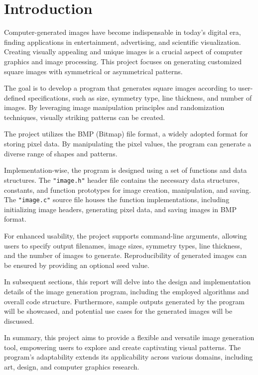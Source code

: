 \documentclass{report}
\begin{document}
\section {Introduction}
\begin{introduction}
    Computer-generated images have become indispensable in today's digital era, finding applications in entertainment, advertising, and scientific visualization. Creating visually appealing and unique images is a crucial aspect of computer graphics and image processing. This project focuses on generating customized square images with symmetrical or asymmetrical patterns.

The goal is to develop a program that generates square images according to user-defined specifications, such as size, symmetry type, line thickness, and number of images. By leveraging image manipulation principles and randomization techniques, visually striking patterns can be created.

The project utilizes the BMP (Bitmap) file format, a widely adopted format for storing pixel data. By manipulating the pixel values, the program can generate a diverse range of shapes and patterns.

Implementation-wise, the program is designed using a set of functions and data structures. The \texttt{"image.h"} header file contains the necessary data structures, constants, and function prototypes for image creation, manipulation, and saving. The \texttt{"image.c"} source file houses the function implementations, including initializing image headers, generating pixel data, and saving images in BMP format.

For enhanced usability, the project supports command-line arguments, allowing users to specify output filenames, image sizes, symmetry types, line thickness, and the number of images to generate. Reproducibility of generated images can be ensured by providing an optional seed value.

In subsequent sections, this report will delve into the design and implementation details of the image generation program, including the employed algorithms and overall code structure. Furthermore, sample outputs generated by the program will be showcased, and potential use cases for the generated images will be discussed.

In summary, this project aims to provide a flexible and versatile image generation tool, empowering users to explore and create captivating visual patterns. The program's adaptability extends its applicability across various domains, including art, design, and computer graphics research.
\end{introduction}
\end{document}
